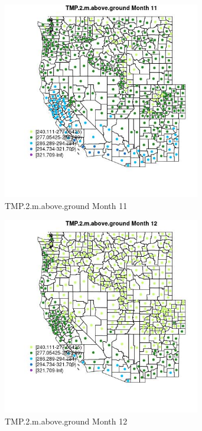\begin{figure} 
\centering  
\includegraphics[width=0.77\textwidth]{Code_Outputs/df_report_ML_predictors_CountyCentroid_Locations_Dates_2008-01-01to2018-12-31_MapObsMo11TMP2maboveground.jpg} 
\caption{\label{fig:df_report_ML_predictors_CountyCentroid_Locations_Dates_2008-01-01to2018-12-31MapObsMo11TMP2maboveground}TMP.2.m.above.ground Month 11} 
\end{figure} 
 

\begin{figure} 
\centering  
\includegraphics[width=0.77\textwidth]{Code_Outputs/df_report_ML_predictors_CountyCentroid_Locations_Dates_2008-01-01to2018-12-31_MapObsMo12TMP2maboveground.jpg} 
\caption{\label{fig:df_report_ML_predictors_CountyCentroid_Locations_Dates_2008-01-01to2018-12-31MapObsMo12TMP2maboveground}TMP.2.m.above.ground Month 12} 
\end{figure} 
 

